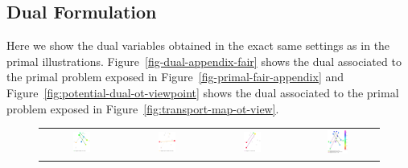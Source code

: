 \newpage
\subsection{Dual Formulation}
Here we show the dual variables obtained in the exact same settings as in the primal illustrations. Figure~\ref{fig-dual-appendix-fair} shows the dual associated to the primal problem exposed in Figure~\ref{fig-primal-fair-appendix} and  Figure~\ref{fig:potential-dual-ot-viewpoint} shows the dual associated to the primal problem exposed in Figure~\ref{fig:transport-map-ot-view}.

\begin{figure}[h!]
\begin{tabular}{@{}c@{}c@{}c@{}c@{}}
\includegraphics[width=0.23\textwidth]{sections/appendix/aistats2021_eot/figures/dual_MOT_1_neg_norm.pdf}&
\includegraphics[width=0.23\textwidth]{sections/appendix/aistats2021_eot/figures/dual_MOT_2_neg_norm.pdf}&
\includegraphics[width=0.23\textwidth]{sections/appendix/aistats2021_eot/figures/dual_MOT_3_neg_norm.pdf}&
\includegraphics[width=0.268\textwidth]{sections/appendix/aistats2021_eot/figures/dual_MOT_1_2_3_neg_norm.pdf}

\end{tabular}
\end{figure}
